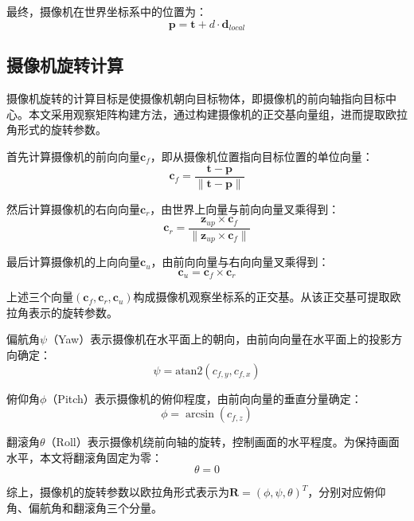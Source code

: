 最终，摄像机在世界坐标系中的位置为：
\begin{equation}
\mathbf{p} = \mathbf{t} + d \cdot \mathbf{d}_{local}
\end{equation}

\subsection{摄像机旋转计算}

摄像机旋转的计算目标是使摄像机朝向目标物体，即摄像机的前向轴指向目标中心。本文采用观察矩阵构建方法\cite{dunn2011math,shirley2009fundamentals}，通过构建摄像机的正交基向量组，进而提取欧拉角形式的旋转参数。

首先计算摄像机的前向向量$\mathbf{c}_f$，即从摄像机位置指向目标位置的单位向量：
\begin{equation}
\mathbf{c}_f = \frac{\mathbf{t} - \mathbf{p}}{\|\mathbf{t} - \mathbf{p}\|}
\end{equation}

然后计算摄像机的右向向量$\mathbf{c}_r$，由世界上向量与前向向量叉乘得到：
\begin{equation}
\mathbf{c}_r = \frac{\mathbf{z}_{up} \times \mathbf{c}_f}{\|\mathbf{z}_{up} \times \mathbf{c}_f\|}
\end{equation}

最后计算摄像机的上向向量$\mathbf{c}_u$，由前向向量与右向向量叉乘得到：
\begin{equation}
\mathbf{c}_u = \mathbf{c}_f \times \mathbf{c}_r
\end{equation}

上述三个向量$(\mathbf{c}_f, \mathbf{c}_r, \mathbf{c}_u)$构成摄像机观察坐标系的正交基。从该正交基可提取欧拉角表示的旋转参数。

偏航角$\psi$（Yaw）表示摄像机在水平面上的朝向，由前向向量在水平面上的投影方向确定：
\begin{equation}
\psi = \text{atan2}(c_{f,y}, c_{f,x})
\end{equation}

俯仰角$\phi$（Pitch）表示摄像机的俯仰程度，由前向向量的垂直分量确定：
\begin{equation}
\phi = \arcsin(c_{f,z})
\end{equation}

翻滚角$\theta$（Roll）表示摄像机绕前向轴的旋转，控制画面的水平程度。为保持画面水平，本文将翻滚角固定为零：
\begin{equation}
\theta = 0
\end{equation}

综上，摄像机的旋转参数以欧拉角形式表示为$\mathbf{R} = (\phi, \psi, \theta)^T$，分别对应俯仰角、偏航角和翻滚角三个分量。

